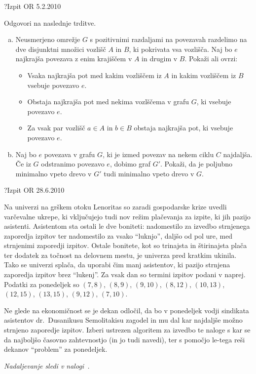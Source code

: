 \begin{naloga}{?}{Izpit OR 5.2.2010}
\begin{vprasanje}
Odgovori na naslednje trditve.
\begin{enumerate}[(a)]
\item Neusmerjeno omrežje $G$ s pozitivnimi razdaljami na povezavah
razdelimo na dve disjunktni množici vozlišč $A$ in $B$,
ki pokrivata vsa vozlišča.
Naj bo $e$ najkrajša povezava z enim krajiščem v $A$ in drugim v $B$.
Pokaži ali ovrzi:
    \begin{itemize}
    \item Vsaka najkrajša pot med kakim vozliščem iz $A$
    in kakim vozliščem iz $B$ vsebuje povezavo $e$.
    \item Obstaja najkrajša pot med nekima vozlščema v grafu $G$,
    ki vsebuje povezavo $e$.
    \item Za vsak par vozlišč $a \in A$ in $b \in B$ obstaja najkrajša pot,
    ki vsebuje povezavo $e$.
    \end{itemize}
\item Naj bo $e$ povezava v grafu $G$,
ki je izmed povezav na nekem ciklu $C$ najdaljša.
Če iz $G$ odstranimo povezavo $e$, dobimo graf $G'$.
Pokaži, da je poljubno minimalno vpeto drevo v $G'$
tudi minimalno vpeto drevo v $G$.
\end{enumerate}
\end{vprasanje}
\begin{odgovor}
\end{odgovor}
\end{naloga}


\begin{naloga}{?}{Izpit OR 28.6.2010}
\begin{vprasanje}
Na univerzi na grškem otoku Lenoritas
so zaradi gospodarske krize uvedli varčevalne ukrepe,
ki vključujejo tudi nov režim plačevanja za izpite,
ki jih pazijo asistenti.
Asistentom sta ostali le dve boniteti:
nadomestilo za izvedbo strnjenega zaporedja izpitov
ter nadomestilo za vsako ``luknjo'', daljšo od pol ure,
med strnjenimi zaporedji izpitov.
Ostale bonitete,
kot so trinajsta in štirinajsta plača
ter dodatek za točnost na delovnem mestu,
je univerza pred kratkim ukinila.
Tako se univerzi splača, da uporabi čim manj asistentov,
ki pazijo strnjena zaporedja izpitov brez ``lukenj''.
Za vsak dan so termini izpitov podani v naprej.
Podatki za ponedeljek so $(7, 8)$, $(8, 9)$, $(9, 10)$, $(8, 12)$,
$(10, 13)$, $(12, 15)$, $(13, 15)$, $(9, 12)$, $(7, 10)$.

Ne glede na ekonomičnost se je dekan odločil,
da bo v ponedeljek vodji sindikata asistentov dr.~Dusanikusu Semolitakisu
zagodel in mu dal kar najdaljše možno strnjeno zaporedje izpitov.
Izberi ustrezen algoritem za izvedbo te naloge
s kar se da najboljšo časovno zahtevnostjo (in jo tudi navedi),
ter s pomočjo le-tega reši dekanov ``problem'' za ponedeljek.

{\em Nadaljevanje sledi v nalogi~.}
\end{vprasanje}
\begin{odgovor}
\end{odgovor}
\end{naloga}


